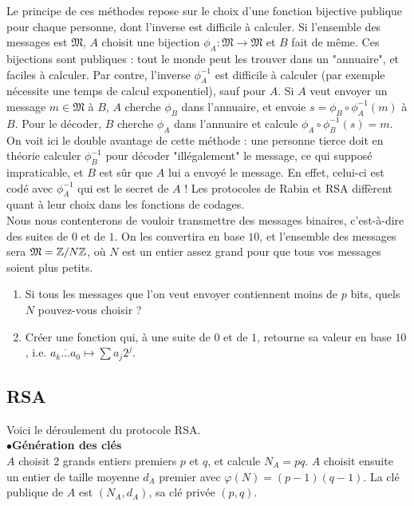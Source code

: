 Le principe de ces méthodes repose sur le choix d'une fonction bijective publique pour chaque personne, dont l'inverse est difficile à calculer. Si l'ensemble des messages est $\mathfrak M$, $A$ choisit une bijection $\phi_A : \mathfrak M \rightarrow \mathfrak M$ et $B$ fait de même. Ces bijections sont publiques : tout le monde peut les trouver dans un "annuaire", et faciles à calculer. Par contre, l'inverse $\phi_A^{-1}$ est difficile à calculer (par exemple nécessite une temps de calcul exponentiel), sauf pour $A$. Si $A$ veut envoyer un message $m\in \mathfrak M$ à $B$, $A$ cherche $\phi_B$ dans l'annuaire, et envoie $s=\phi_B\circ \phi_A^{-1}(m)$ à $B$. Pour le décoder, $B$ cherche $\phi_A$ dans l'annuaire et calcule $\phi_A\circ\phi_B^{-1}(s)=m$. On voit ici le double avantage de cette méthode :  une personne tierce doit en théorie calculer $\phi_B^{-1}$ pour décoder "illégalement" le message, ce qui supposé impraticable, et $B$ est sûr que $A$ lui a envoyé le message. En effet, celui-ci est codé avec $\phi_A^{-1}$ qui est le secret de $A$ ! Les protocoles de Rabin et RSA diffèrent quant à leur choix dans les fonctions de codages.\\

Nous nous contenterons de vouloir transmettre des messages binaires, c'est-à-dire des suites de $0$ et de $1$. On les convertira en base $10$, et l'ensemble des messages sera $\mathfrak M = \mathbb Z/N\mathbb Z$, où $N$ est un entier assez grand pour que tous vos messages soient plus petits. 
\begin{enumerate}
\item Si tous les messages que l'on veut envoyer contiennent moins de $p$ bits, quels $N$ pouvez-vous choisir ?
\item Créer une fonction qui, à une suite de $0$ et de $1$, retourne sa valeur en base $10$, i.e. $\overline{a_k ... a_0}\mapsto \sum a_j 2^j$.
\end{enumerate}

\subsection{RSA}
Voici le déroulement du protocole RSA.\\

$\bullet$\textbf{Génération des clés}\\
$A$ choisit $2$ grands entiers premiers $p$ et $q$, et calcule $N_A=pq$. $A$ choisit ensuite un entier de taille moyenne $d_A$ premier avec $\varphi(N)=(p-1)(q-1)$. La clé publique de $A$ est $(N_A,d_A)$, sa clé privée $(p,q)$.  \\

